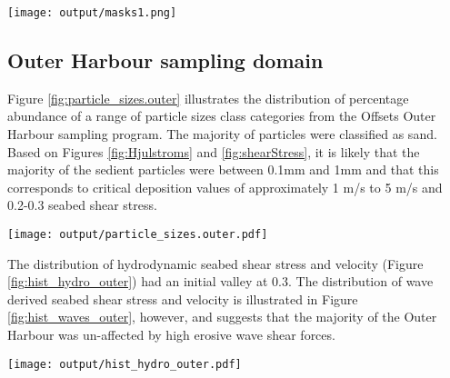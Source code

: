 \documentclass[a4paper]{article}
\let\origfigure=\figure
\let\endorigfigure=\endfigure
\renewenvironment{figure}[1][]{%
   \origfigure[H]
}{%
   \endorigfigure
}
\begin{document}
\begin{figure}
\centering\scriptsize
\texttt{[image: output/masks1.png]}
\caption{East Arm mask derived from the combination of 50th percentile
seabed shear stress and each of the wave derived seabed shear stresses.
The blue areas indicate areas of predicted relatively low erosion and
transport potential and thus good candidate areas for sample site
allocation. The black dots illustrate the position of Munksgaard 2012
sediment sampling sites.\label{fig:mask_east}}
\end{figure}

\hypertarget{outer-harbour-sampling-domain}{%
\subsection{Outer Harbour sampling
domain}\label{outer-harbour-sampling-domain}}

Figure \ref{fig:particle_sizes.outer} illustrates the distribution of
percentage abundance of a range of particle sizes class categories from
the Offsets Outer Harbour sampling program. The majority of particles
were classified as sand. Based on Figures \ref{fig:Hjulstroms} and
\ref{fig:shearStress}, it is likely that the majority of the sedient
particles were between 0.1mm and 1mm and that this corresponds to
critical deposition values of approximately 1 m/s to 5 m/s and 0.2-0.3
seabed shear stress.

\begin{figure}
\centering\scriptsize
\texttt{[image: output/particle\_sizes.outer.pdf]}
\caption{The percentage abundance of different sediment grain sizes
observed across the Offsets Outer Harbour sediment sampling
program.\label{fig:particle_sizes.outer}}
\end{figure}

The distribution of hydrodynamic seabed shear stress and velocity
(Figure \ref{fig:hist_hydro_outer}) had an initial valley at 0.3. The
distribution of wave derived seabed shear stress and velocity is
illustrated in Figure \ref{fig:hist_waves_outer}, however, and suggests
that the majority of the Outer Harbour was un-affected by high erosive
wave shear forces.

\begin{figure}
\centering\scriptsize
\texttt{[image: output/hist\_hydro\_outer.pdf]}
\caption{Frequency distributions of hydrodynamic products in the Outer
Harbour area.\label{fig:hist_hydro_outer}}
\end{figure}
\end{document}
